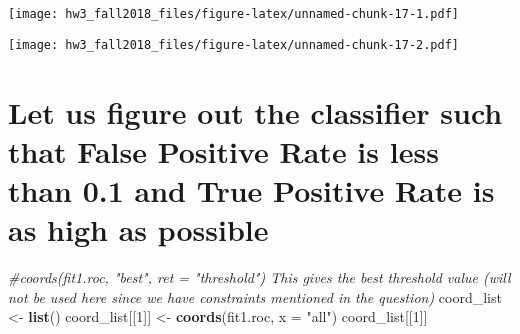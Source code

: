 \documentclass[]{article}
\newenvironment{Shaded}{\begin{snugshade}}{\end{snugshade}}
\newcommand{\KeywordTok}[1]{\textcolor[rgb]{0.13,0.29,0.53}{\textbf{#1}}}
\newcommand{\DataTypeTok}[1]{\textcolor[rgb]{0.13,0.29,0.53}{#1}}
\newcommand{\DecValTok}[1]{\textcolor[rgb]{0.00,0.00,0.81}{#1}}
\newcommand{\StringTok}[1]{\textcolor[rgb]{0.31,0.60,0.02}{#1}}
\newcommand{\CommentTok}[1]{\textcolor[rgb]{0.56,0.35,0.01}{\textit{#1}}}
\newcommand{\OperatorTok}[1]{\textcolor[rgb]{0.81,0.36,0.00}{\textbf{#1}}}
\newcommand{\NormalTok}[1]{#1}
\begin{document}
\texttt{[image: hw3\_fall2018\_files/figure-latex/unnamed-chunk-17-1.pdf]}

\begin{Shaded}
\end{Shaded}

\texttt{[image: hw3\_fall2018\_files/figure-latex/unnamed-chunk-17-2.pdf]}

\section{Let us figure out the classifier such that False Positive Rate
is less than 0.1 and True Positive Rate is as high as
possible}\label{let-us-figure-out-the-classifier-such-that-false-positive-rate-is-less-than-0.1-and-true-positive-rate-is-as-high-as-possible}

\begin{Shaded}
\begin{Highlighting}[]
\CommentTok{#coords(fit1.roc, "best", ret = "threshold") This gives the best threshold value (will not be used here since we have constraints mentioned in the question)}
\NormalTok{coord_list <-}\StringTok{ }\KeywordTok{list}\NormalTok{()}
\NormalTok{coord_list[[}\DecValTok{1}\NormalTok{]] <-}\StringTok{ }\KeywordTok{coords}\NormalTok{(fit1.roc, }\DataTypeTok{x =} \StringTok{"all"}\NormalTok{)}
\NormalTok{coord_list[[}\DecValTok{1}\NormalTok{]]}
\end{Highlighting}
\end{Shaded}
\end{document}
